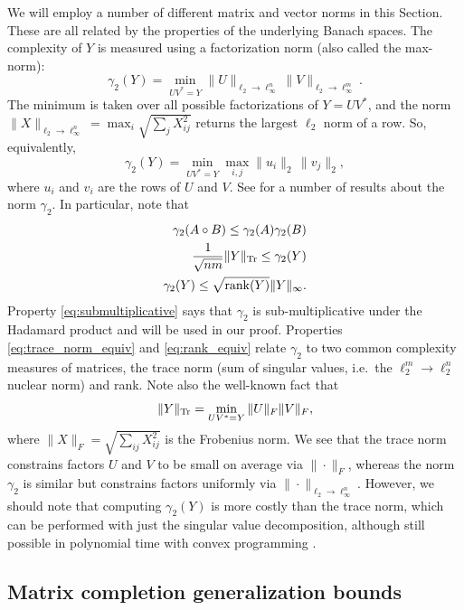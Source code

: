 We will employ a number of different matrix and vector norms in this Section.
These are all related by the properties of the underlying Banach spaces.
The complexity of $Y$ 
is measured using a factorization norm (also called the max-norm):
\[
	\gamma_2 (Y) = \min_{UV^* = Y} \|U\|_{\ell_2 \to \ell_\infty^n} \|V\|_{\ell_2 \to \ell_\infty^m}.
\]
The minimum is taken over all possible factorizations of $Y = UV^*$, 
and the norm 
$\| X \|_{\ell_2 \to \ell_\infty^n} = \max_i \sqrt{\sum_j X^2_{ij}}$
returns the largest $\ell_2$ norm of a row.
So, equivalently,
\[
	\gamma_2 (Y) = \min_{U V^* = Y} \max_{i,j} \|u_i \|_2 \, \|v_j \|_2 ,
\]
where $u_i$ and $v_i$ are the rows of $U$ and $V$.
See \citet*{linial2007} for a number of results about the norm $\gamma_2$.
In particular, note that
\begin{align}
\gamma_2(A \circ B) \leq \gamma_2(A) \gamma_2(B) \label{eq:submultiplicative} \\
  \label{eq:trace_norm_equiv}
  \frac{1}{\sqrt{n m}} \| Y \|_{\rm Tr} \leq \gamma_2(Y) \\ %
  \label{eq:rank_equiv}
  \gamma_2(Y) \leq \sqrt{\mathrm{rank} (Y) } \| Y \|_{\infty}.
\end{align}
Property \eqref{eq:submultiplicative} says that $\gamma_2$
is sub-multiplicative under the Hadamard product \citep*{lee2008,heiman2014} and will be used in our proof.
Properties \eqref{eq:trace_norm_equiv} and \eqref{eq:rank_equiv}
relate $\gamma_2$ to two common complexity measures of matrices,
the trace norm (sum of singular values, i.e.\ the $\ell^m_2 \to \ell^n_2$ nuclear norm) 
and rank.
Note also the well-known fact that
\[
\| Y \|_{\rm Tr} = \min_{UV^* = Y} \| U \|_F \|V \|_F ,
\]
where 
$\| X \|_F = \sqrt{\sum_{ij} X_{ij}^2}$ 
is the Frobenius norm.
We see that the trace norm constrains factors $U$ and $V$ to be small on average
via $\| \cdot \|_F$,
whereas the norm $\gamma_2$ is similar but constrains factors uniformly
via $\| \cdot \|_{\ell_2 \to \ell_\infty^n}$.
However, we should note that computing $\gamma_2(Y)$ is more costly than the
trace norm, which can be performed with just the singular value decomposition,
although still possible in polynomial time with convex programming \citep*{heiman2014}.


\subsection{Matrix completion generalization bounds}

